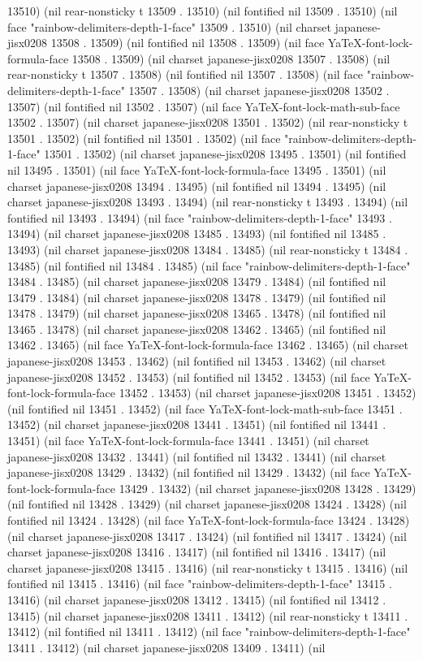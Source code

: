 13510) (nil rear-nonsticky t 13509 . 13510) (nil fontified nil 13509 . 13510) (nil face "rainbow-delimiters-depth-1-face" 13509 . 13510) (nil charset japanese-jisx0208 13508 . 13509) (nil fontified nil 13508 . 13509) (nil face YaTeX-font-lock-formula-face 13508 . 13509) (nil charset japanese-jisx0208 13507 . 13508) (nil rear-nonsticky t 13507 . 13508) (nil fontified nil 13507 . 13508) (nil face "rainbow-delimiters-depth-1-face" 13507 . 13508) (nil charset japanese-jisx0208 13502 . 13507) (nil fontified nil 13502 . 13507) (nil face YaTeX-font-lock-math-sub-face 13502 . 13507) (nil charset japanese-jisx0208 13501 . 13502) (nil rear-nonsticky t 13501 . 13502) (nil fontified nil 13501 . 13502) (nil face "rainbow-delimiters-depth-1-face" 13501 . 13502) (nil charset japanese-jisx0208 13495 . 13501) (nil fontified nil 13495 . 13501) (nil face YaTeX-font-lock-formula-face 13495 . 13501) (nil charset japanese-jisx0208 13494 . 13495) (nil fontified nil 13494 . 13495) (nil charset japanese-jisx0208 13493 . 13494) (nil rear-nonsticky t 13493 . 13494) (nil fontified nil 13493 . 13494) (nil face "rainbow-delimiters-depth-1-face" 13493 . 13494) (nil charset japanese-jisx0208 13485 . 13493) (nil fontified nil 13485 . 13493) (nil charset japanese-jisx0208 13484 . 13485) (nil rear-nonsticky t 13484 . 13485) (nil fontified nil 13484 . 13485) (nil face "rainbow-delimiters-depth-1-face" 13484 . 13485) (nil charset japanese-jisx0208 13479 . 13484) (nil fontified nil 13479 . 13484) (nil charset japanese-jisx0208 13478 . 13479) (nil fontified nil 13478 . 13479) (nil charset japanese-jisx0208 13465 . 13478) (nil fontified nil 13465 . 13478) (nil charset japanese-jisx0208 13462 . 13465) (nil fontified nil 13462 . 13465) (nil face YaTeX-font-lock-formula-face 13462 . 13465) (nil charset japanese-jisx0208 13453 . 13462) (nil fontified nil 13453 . 13462) (nil charset japanese-jisx0208 13452 . 13453) (nil fontified nil 13452 . 13453) (nil face YaTeX-font-lock-formula-face 13452 . 13453) (nil charset japanese-jisx0208 13451 . 13452) (nil fontified nil 13451 . 13452) (nil face YaTeX-font-lock-math-sub-face 13451 . 13452) (nil charset japanese-jisx0208 13441 . 13451) (nil fontified nil 13441 . 13451) (nil face YaTeX-font-lock-formula-face 13441 . 13451) (nil charset japanese-jisx0208 13432 . 13441) (nil fontified nil 13432 . 13441) (nil charset japanese-jisx0208 13429 . 13432) (nil fontified nil 13429 . 13432) (nil face YaTeX-font-lock-formula-face 13429 . 13432) (nil charset japanese-jisx0208 13428 . 13429) (nil fontified nil 13428 . 13429) (nil charset japanese-jisx0208 13424 . 13428) (nil fontified nil 13424 . 13428) (nil face YaTeX-font-lock-formula-face 13424 . 13428) (nil charset japanese-jisx0208 13417 . 13424) (nil fontified nil 13417 . 13424) (nil charset japanese-jisx0208 13416 . 13417) (nil fontified nil 13416 . 13417) (nil charset japanese-jisx0208 13415 . 13416) (nil rear-nonsticky t 13415 . 13416) (nil fontified nil 13415 . 13416) (nil face "rainbow-delimiters-depth-1-face" 13415 . 13416) (nil charset japanese-jisx0208 13412 . 13415) (nil fontified nil 13412 . 13415) (nil charset japanese-jisx0208 13411 . 13412) (nil rear-nonsticky t 13411 . 13412) (nil fontified nil 13411 . 13412) (nil face "rainbow-delimiters-depth-1-face" 13411 . 13412) (nil charset japanese-jisx0208 13409 . 13411) (nil 